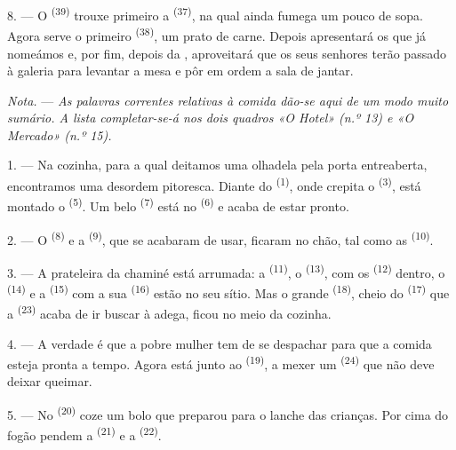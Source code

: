 8. --- O  \textsuperscript{(39)} trouxe primeiro a 
\textsuperscript{(37)}, na qual ainda fumega um pouco de sopa. Agora serve o
primeiro  \textsuperscript{(38)}, um prato de carne. Depois
apresentará os que já nomeámos e, por fim, depois da ,
aproveitará que os seus senhores terão passado à galeria para levantar a
mesa e pôr em ordem a sala de jantar.

\textit{Nota.} --- \textit{As palavras correntes relativas à comida
dão-se aqui de um modo muito sumário. A lista completar-se-á nos dois
quadros «O Hotel» (n.º 13) e «O Mercado» (n.º 15).}

\VUsaut{4.6mm}
\VUsaut{3.0mm}

1. --- Na cozinha, para a qual deitamos uma olhadela pela porta
entreaberta, encontramos uma desordem pitoresca. Diante do  \textsuperscript{(1)}, onde crepita o  \textsuperscript{(3)}, está
montado o  \textsuperscript{(5)}. Um belo 
\textsuperscript{(7)} está no  \textsuperscript{(6)} e acaba de estar
pronto.

2. --- O  \textsuperscript{(8)} e a 
\textsuperscript{(9)}, que se acabaram de usar, ficaram no chão, tal como as
 \textsuperscript{(10)}.

3. --- A prateleira da chaminé está arrumada: a 
\textsuperscript{(11)}, o  \textsuperscript{(13)}, com os
 \textsuperscript{(12)} dentro, o 
\textsuperscript{(14)} e a  \textsuperscript{(15)} com a sua
 \textsuperscript{(16)} estão no seu sítio. Mas o grande
 \textsuperscript{(18)}, cheio do 
\textsuperscript{(17)} que a  \textsuperscript{(23)} acaba de ir
buscar à adega, ficou no meio da cozinha.

4. --- A verdade é que a pobre mulher tem de se despachar para que a
comida esteja pronta a tempo. Agora está junto ao 
\textsuperscript{(19)}, a mexer um  \textsuperscript{(24)} que não deve
deixar queimar.

5. --- No  \textsuperscript{(20)} coze um bolo que preparou para o
lanche das crianças. Por cima do fogão pendem a 
\textsuperscript{(21)} e a  \textsuperscript{(22)}.

